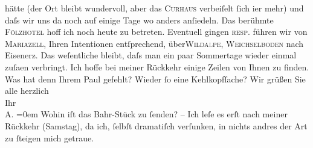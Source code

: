 \begin{ledgroupsized}[t]{13cm}
               hätte (der Ort bleibt wundervoll, aber das \textsc{Curhaus} verbeiſelt ſich i{\geminationm}er mehr) und daſs wir uns da{\geminationn} noch auf einige Tage wo anders anſiedeln. Das berühmte
                  {\pb}\textsc{Fölzhotel} hoff ich noch heute zu betreten. Eventuell gingen \textsc{resp.} führen wir von \textsc{Mariazell}, Ihren Intentionen entſprechend, über\textsc{Wilda\textcolor{gray}{l}pe}, \textsc{Weichselboden} nach Eisenerz. Das weſentliche bleibt, daſs
               man ein paar Sommertage wieder einmal zuſa{\geminationm}en verbringt.
               Ich hoffe bei meiner Rückkehr einige Zeilen von Ihnen zu finden. Was hat denn {\pb}Ihrem Paul gefehlt? Wieder ſo eine Kehlkopfſache? \pend
           \pstart
           Wir grüßen Sie alle herzlich {\\[\baselineskip]}Ihr {\\[\baselineskip]}\spacefill\mbox{A.}\pend
           \leftskip=0em{}\pstart
           \noindent{} Wohin iſt das Bahr-Stück zu ſenden? – Ich leſe es erſt nach
                  meiner Rückkehr \introOben{}(Samstag)\introOben{}, da ich, ſelbſt dramatiſch verſunken, in
                  nichts andres der Art zu ſteigen mich getraue. \pend
           
         
         \endnumbering{}\end{ledgroupsized}\begin{anhang}\end{anhang}\newcommand{\dateiname}{L03000}\newcommand{\titel}{Arthur Schnitzler an Felix Salten, 20. 7. 1905}\newcommand{\editorInnen}{Martin Anton Müller und Laura Untner}
      